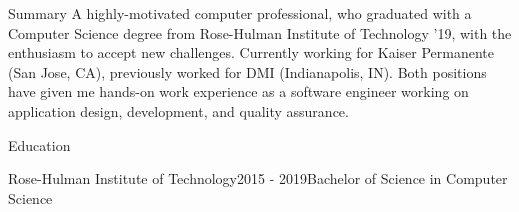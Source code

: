 \documentclass{resume} %
\begin{document}
\begin{rSection}{Summary}
{A highly-motivated computer professional, who graduated with a Computer Science degree from Rose-Hulman Institute of Technology '19, 
with the enthusiasm to accept new challenges. Currently working for Kaiser Permanente (San Jose, CA), previously worked for DMI (Indianapolis, IN). 
Both positions have given me hands-on work experience as a software engineer working on application design, development, and quality assurance.}
\end{rSection}

\begin{rSection}{Education}
\begin{rsemisection}{Rose-Hulman Institute of Technology}{2015 - 2019}{Bachelor of Science in Computer Science}
\end{rsemisection}
\end{rSection}
\end{document}
